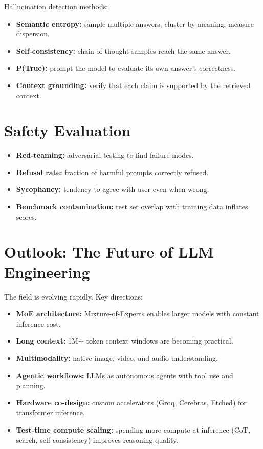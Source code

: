 \documentclass[11pt,a4paper]{book}
\theoremstyle{definition}
\begin{document}
Hallucination detection methods:
\begin{itemize}
	\item \textbf{Semantic entropy:} sample multiple answers, cluster by meaning, measure dispersion.
	\item \textbf{Self-consistency:} chain-of-thought samples reach the same answer.
	\item \textbf{P(True):} prompt the model to evaluate its own answer's correctness.
	\item \textbf{Context grounding:} verify that each claim is supported by the retrieved context.
\end{itemize}

\section{Safety Evaluation}

\begin{itemize}
	\item \textbf{Red-teaming:} adversarial testing to find failure modes.
	\item \textbf{Refusal rate:} fraction of harmful prompts correctly refused.
	\item \textbf{Sycophancy:} tendency to agree with user even when wrong.
	\item \textbf{Benchmark contamination:} test set overlap with training data inflates scores.
\end{itemize}

\section{Outlook: The Future of LLM Engineering}

The field is evolving rapidly. Key directions:
\begin{itemize}
	\item \textbf{MoE architecture:} Mixture-of-Experts enables larger models with constant inference cost.
	\item \textbf{Long context:} 1M+ token context windows are becoming practical.
	\item \textbf{Multimodality:} native image, video, and audio understanding.
	\item \textbf{Agentic workflows:} LLMs as autonomous agents with tool use and planning.
	\item \textbf{Hardware co-design:} custom accelerators (Groq, Cerebras, Etched) for transformer inference.
	\item \textbf{Test-time compute scaling:} spending more compute at inference (CoT, search, self-consistency) improves reasoning quality.
\end{itemize}
\end{document}

